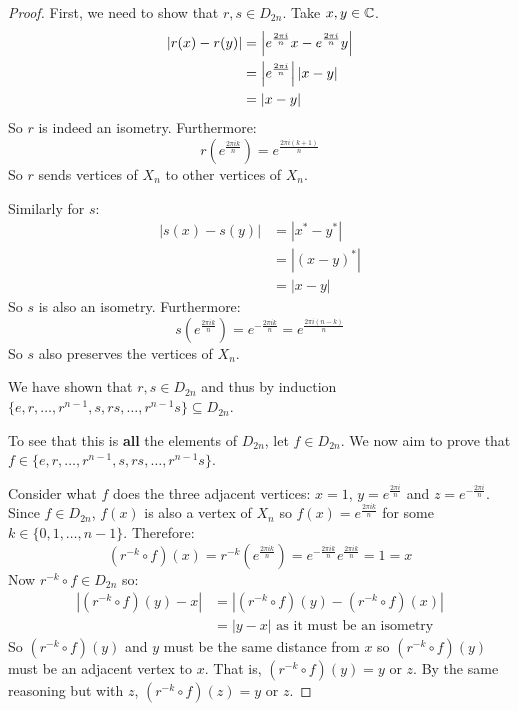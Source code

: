 \documentclass[../main.tex]{subfiles}
\begin{document}
\begin{proof}
  First, we need to show that $r, s \in D_{2n}$.
  Take $x, y \in \mathbb{C}$.
  \begin{align*}
    |r(x) - r(y)| &= \left\lvert e^{\frac{2\pi i}{n}}x - e^{\frac{2\pi i}{n}}y \right\rvert \\
                  &= \left\lvert e^{\frac{2\pi i}{n}} \right\rvert|x - y| \\
                  &= |x - y|
  \end{align*}
  So $r$ is indeed an isometry.
  Furthermore:
  \[
    r\left(e^{\frac{2 \pi i k}{n}}\right) = e^{\frac{2\pi i(k+1)}{n}}
  \]
  So $r$ sends vertices of $X_n$ to other vertices of $X_n$.

  Similarly for $s$:
  \begin{align*}
    |s(x) - s(y)| &= |x^{*} - y^{*}| \\
                  &= |(x - y)^{*}| \\
                  &= |x-y|
  \end{align*}
  So $s$ is also an isometry.
  Furthermore:
  \[
    s\left(e^{\frac{2\pi i k}{n}}\right) = e^{-\frac{2\pi ik}{n}} = e^{\frac{2\pi i (n-k)}{n}}
  \]
  So $s$ also preserves the vertices of $X_n$.

  We have shown that $r, s \in D_{2n}$ and thus by induction $\{e, r, \ldots, r^{n-1}, s, rs, \ldots, r^{n-1}s\} \subseteq D_{2n}$.

  To see that this is \textbf{all} the elements of $D_{2n}$, let $f \in D_{2n}$.
  We now aim to prove that $f \in \{e, r, \ldots, r^{n-1}, s, rs, \ldots, r^{n-1}s\}$.

  Consider what $f$ does the three adjacent vertices: $x = 1$, $y = e^{\frac{2\pi i}{n}}$ and $z =e^{-\frac{2\pi i}{n}}$.
  Since $f \in D_{2n}$, $f(x)$ is also a vertex of $X_n$ so $f(x) = e^{\frac{2\pi i k}{n}}$ for some $k \in \{0, 1, \ldots, n-1\}$.
  Therefore:
  \[
    (r^{-k} \circ f)(x) = r^{-k}(e^{\frac{2 \pi i k}{n}}) = e^{-\frac{2\pi i k}{n}} e^{\frac{2 \pi i k}{n}} = 1 = x
  \]
  Now $r^{-k} \circ f \in D_{2n}$ so:
  \begin{align*}
    |(r^{-k} \circ f)(y) - x| &= |(r^{-k} \circ f)(y) - (r^{-k} \circ f)(x)| \\
                              &= |y - x| \text{ as it must be an isometry}
  \end{align*}
  So $(r^{-k} \circ f)(y)$ and $y$ must be the same distance from $x$ so $(r^{-k} \circ f)(y)$ must be an adjacent vertex to $x$.
  That is, $(r^{-k} \circ f)(y) = y \text{ or } z$.
  By the same reasoning but with $z$, $(r^{-k} \circ f)(z) = y \text{ or }z$.


\end{proof}
\end{document}
